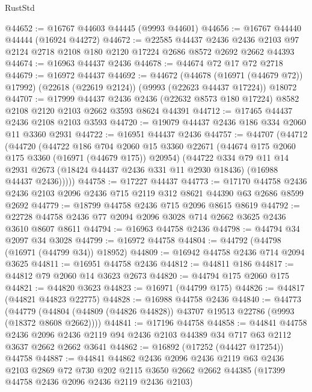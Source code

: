 \begin{lexlean}{RustStd}
\begin{coremodule}
@44652 := @16767 @44603 @44445 (@9993 @44601)
@44656 := @16767 @44440 @44444 (@16924 @44272)
@44672 := @22585
    @44437
    @2436
    @2436
    @2103
    @97
    @2124
    @2718
    @2108
    @180
    @2120
    @17224
    @2686
    @8572
    @2692
    @2662
    @44393
@44674 := @16963 @44437 @2436
@44678 := @44674 @72 @17 @72 @2718
@44679 := @16972 @44437
@44692 := @44672
    (@44678 (@16971 (@44679 @72)) @17992)
    (@22618 (@22619 @2124))
    (@9993 (@22623 @44437 @17224))
    @18072
@44707 := @17999
    @44437
    @2436
    @2436
    (@22632 @8573 @180 @17224)
    @8582
    @2108
    @2120
    @2103
    @2662
    @3593
    @8624
    @44391
@44712 := @17465 @44437 @2436 @2108 @2103 @3593
@44720 := @19079 @44437 @2436 @186 @334 @2060 @11 @3360 @2931
@44722 := @16951 @44437 @2436
@44757 := @44707
    (@44712
      (@44720
        (@44722
          @186
          @704
          @2060
          @15
          @3360
          @22671
          (@44674 @175 @2060 @175 @3360 (@16971 (@44679 @175)) @20954)
          (@44722
            @334
            @79
            @11
            @14
            @2931
            @2673
            (@18424 @44437 @2436 @331 @11 @2930 @18436)
            (@16988 @44437 @2436)))))
@44758 := @17227 @44437
@44773 := @17170
    @44758
    @2436
    @2436
    @2103
    @2096
    @2436
    @715
    @2119
    @312
    @8621
    @44390
    @63
    @2686
    @8599
    @2692
@44779 := @18799 @44758 @2436 @715 @2096 @8615 @8619
@44792 := @22728 @44758 @2436 @77 @2094 @2096 @3028 @714 @2662 @3625 @2436 @3610 @8607 @8611
@44794 := @16963 @44758 @2436
@44798 := @44794 @34 @2097 @34 @3028
@44799 := @16972 @44758
@44804 := @44792 (@44798 (@16971 (@44799 @34)) @18952)
@44809 := @16942 @44758 @2436 @714 @2094 @3625
@44811 := @16951 @44758 @2436
@44812 := @44811 @186
@44817 := @44812 @79 @2060 @14 @3623 @2673
@44820 := @44794 @175 @2060 @175
@44821 := @44820 @3623
@44823 := @16971 (@44799 @175)
@44826 := @44817 (@44821 @44823 @22775)
@44828 := @16988 @44758 @2436
@44840 := @44773
    (@44779 (@44804 (@44809 (@44826 @44828)) @43707 @19513 @22786 (@9993 (@18372 @8608 @2662))))
@44841 := @17196 @44758
@44858 := @44841
    @44758
    @2436
    @2096
    @2436
    @2119
    @94
    @2436
    @2103
    @44389
    @34
    @717
    @63
    @2112
    @3637
    @2662
    @2662
    @3641
@44862 := @16892 (@17252 (@44427 @17254)) @44758
@44887 := @44841
    @44862
    @2436
    @2096
    @2436
    @2119
    @63
    @2436
    @2103
    @2869
    @72
    @730
    @202
    @2115
    @3650
    @2662
    @2662
    @44385
    (@17399 @44758 @2436 @2096 @2436 @2119 @2436 @2103)

\end{coremodule}
\end{lexlean}
